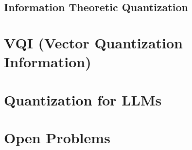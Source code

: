 \subsection{Information Theoretic Quantization}





































\section{VQI (Vector Quantization Information)}
\section{Quantization for LLMs}

\section{Open Problems}